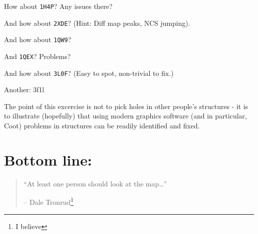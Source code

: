 \documentclass{article}
\begin{document}
How about \texttt{1H4P}?  Any issues there?

And how about \texttt{2XDE}? %
(Hint: Diff map peaks, NCS jumping).

And how about \texttt{1QW9}?

And \texttt{1QEX}?  Problems?

And how about \texttt{3L0F}? (Easy to spot, non-trivial to
fix.) %

Another: 3f1l





The point of this excercise is not to pick holes in other people's
structures - it is to illustrate (hopefully) that using modern
graphics software (and in particular, Coot) problems in structures can
be readily identified and fixed.  


\section*{Bottom line:}

\begin{quotation}
  ``At least one person should look at the map\ldots'' 

  -- Dale Tronrud\footnote{I believe}
\end{quotation}
\end{document}
